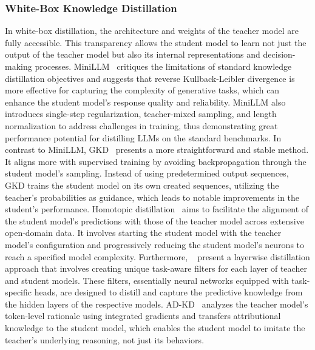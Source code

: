 \subsubsection{White-Box Knowledge Distillation}
In white-box distillation, the architecture and weights of the teacher model are fully accessible. This transparency allows the student model to learn not just the output of the teacher model but also its internal representations and decision-making processes.
MiniLLM~\citep{gu2023knowledge} critiques the limitations of standard knowledge distillation objectives and suggests that reverse Kullback-Leibler divergence is more effective for capturing the complexity of generative tasks, which can enhance the student model's response quality and reliability. MiniLLM also introduces single-step regularization, teacher-mixed sampling, and length normalization to address challenges in training, thus demonstrating great performance potential for distilling LLMs on the standard benchmarks.
In contrast to MiniLLM, GKD~\citep{agarwal2023gkd} presents a more straightforward and stable method. It aligns more with supervised training by avoiding backpropagation through the student model’s sampling. Instead of using predetermined output sequences, GKD trains the student model on its own created sequences, utilizing the teacher's probabilities as guidance, which leads to notable improvements in the student's performance.
Homotopic distillation~\citep{liang2023homodistil} aims to facilitate the alignment of the student model's predictions with those of the teacher model across extensive open-domain data. It involves starting the student model with the teacher model's configuration and progressively reducing the student model's neurons to reach a specified model complexity.
Furthermore, ~\cite{liang2023less} present a layerwise distillation approach that involves creating unique task-aware filters for each layer of teacher and student models. These filters, essentially neural networks equipped with task-specific heads, are designed to distill and capture the predictive knowledge from the hidden layers of the respective models.
AD-KD~\citep{wu2023ad} analyzes the teacher model's token-level rationale using integrated gradients and transfers attributional knowledge to the student model, which enables the student model to imitate the teacher's underlying reasoning, not just its behaviors.



